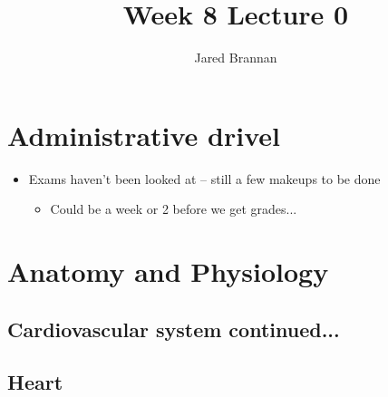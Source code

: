 \documentclass{article}
\title{Week 8 Lecture 0}
\author{Jared Brannan }
\theoremstyle{definition}
\begin{document}
\maketitle

\section{Administrative drivel}
\begin{itemize}
	\item Exams haven't been looked at -- still a few makeups to be done
		\begin{itemize}
			\item Could be a week or 2 before we get grades...
		\end{itemize}
\end{itemize}

\section{Anatomy and Physiology}

\subsection{Cardiovascular system continued...}
\subsection{Heart}
\end{document}
